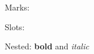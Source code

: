 \documentclass{article}
\begin{document}
Marks: \Checkmark\ \CheckmarkBold\ \XSolid\ \XSolidBold\ \XSolidBrush

Slots: \ScissorRight\ \Phone\ \Envelope\ \HandRight\ \PencilRight

Nested: \textbf{bold \Checkmark} and \emph{italic \XSolidBrush}
\end{document}
